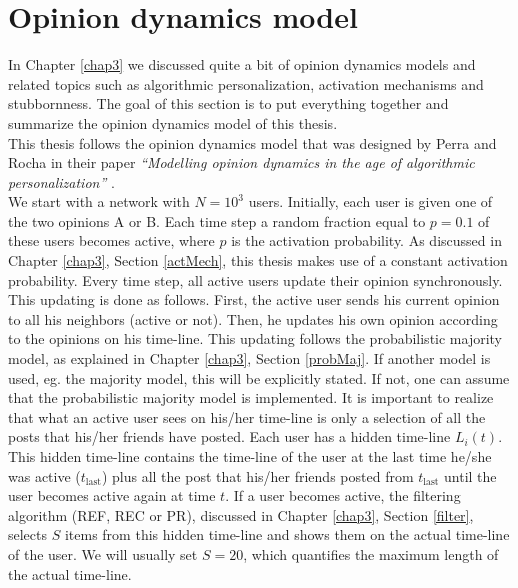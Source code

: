 \documentclass[11 pt , letterpaper , twoside , openright]{book}
\begin{document}
\section{Opinion dynamics model}\label{opinionmodel}

In Chapter \ref{chap3} we discussed quite a bit of opinion dynamics models and related topics such as algorithmic personalization, activation mechanisms and stubbornness. The goal of this section is to put everything together and summarize the opinion dynamics model of this thesis.\\
\newline
This thesis follows the opinion dynamics model that was designed by Perra and Rocha in their paper \textit{``Modelling opinion dynamics in the age of algorithmic personalization''} \cite{Perra2019}. \\
\newline
We start with a network with $N = 10^3$ users. Initially, each user is given one of the two opinions A or B. Each time step a random fraction equal to $p= 0.1$ of these users becomes active, where $p$ is the activation probability. As discussed in Chapter \ref{chap3}, Section \ref{actMech}, this thesis makes use of a constant activation probability. Every time step, all active users update their opinion synchronously. This updating is done as follows. First, the active user sends his current opinion to all his neighbors (active or not). Then, he updates his own opinion according to the opinions on his time-line. This updating follows the probabilistic majority model, as explained in Chapter \ref{chap3}, Section \ref{probMaj}. If another model is used, eg. the majority model, this will be explicitly stated. If not, one can assume that the probabilistic majority model is implemented. It is important to realize that what an active user sees on his/her time-line is only a selection of all the posts that his/her friends have posted. Each user has a hidden time-line $L_i(t)$. This hidden time-line contains the time-line of the user at the last time he/she was active ($t_{\text{last}}$) plus all the post that his/her friends posted from $t_{\text{last}}$ until the user becomes active again at time $t$. If a user becomes active, the filtering algorithm (REF, REC or PR), discussed in Chapter \ref{chap3}, Section \ref{filter}, selects $S$ items from this hidden time-line and shows them on the actual time-line of the user. We will usually set $S = 20$, which quantifies the maximum length of the actual time-line.\\
\end{document}
